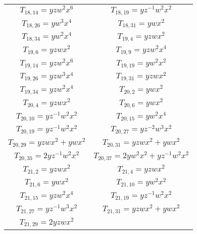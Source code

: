 \begin{longtable}{|c|c|}
$T_{18,14}= yzw^2x^6$&

$T_{18,19}= yz^{-1}w^2x^2$\\

$T_{18,26}= yw^3x^4$&

$T_{18,31}= ywx^2$\\

$T_{18,34}= yw^2x^4$&

$T_{19,4}= yzwx^2$\\

$T_{19,6}= yzwx^2$&

$T_{19,9}= yzw^2x^4$\\

$T_{19,14}= yzw^2x^6$&

$T_{19,19}= yw^2x^2$\\

$T_{19,26}= yzw^3x^4$&

$T_{19,31}= yzwx^2$\\

$T_{19,34}= yzw^2x^4$&

$T_{20,2}= ywx^2$\\

$T_{20,4}= yzwx^2$&

$T_{20,6}= ywx^2$\\

$T_{20,10}= yz^{-1}w^2x^2$&

$T_{20,15}= yw^2x^4$\\

$T_{20,19}= yz^{-1}w^2x^2$&

$T_{20,27}= yz^{-2}w^3x^2$\\

$T_{20,29}= yzwx^2+ywx^2$&

$T_{20,31}= yzwx^2+ywx^2$\\

$T_{20,35}= 2yz^{-1}w^2x^2$ &

$T_{20,37}= 2yw^2x^2+yz^{-1}w^2x^2$\\

$T_{21,2}= yzwx^2$&

$T_{21,4}= yzwx^2$ \\
$T_{21,6}= ywx^2$&

$T_{21,10}= yw^2x^2$ \\

$T_{21,15}= yzw^2x^4$ &

$T_{21,19}= yz^{-1}w^2x^2$\\

$T_{21,27}= yz^{-1}w^3x^2$ &

$T_{21,31}= yzwx^2+ywx^2$\\ 
$T_{21,29}= 2yzwx^2$ &


\end{longtable}
